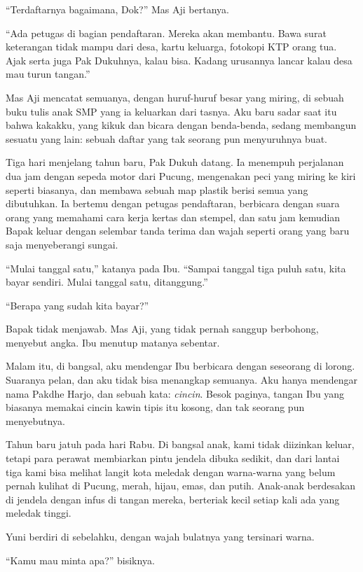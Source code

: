 \documentclass[11pt,twoside,openany]{book}
\makeatletter
\newcommand{\scenebreak}{\par\vspace{0.9em}{\centering\textsc{*\hspace{0.7em}*\hspace{0.7em}*}\par}\vspace{0.9em}\@afterindentfalse\@afterheading}
\makeatother
\begin{document}
``Terdaftarnya bagaimana, Dok?'' Mas Aji bertanya.

``Ada petugas di bagian pendaftaran. Mereka akan membantu. Bawa surat keterangan tidak mampu dari desa, kartu keluarga, fotokopi KTP orang tua. Ajak serta juga Pak Dukuhnya, kalau bisa. Kadang urusannya lancar kalau desa mau turun tangan.''

Mas Aji mencatat semuanya, dengan huruf-huruf besar yang miring, di sebuah buku tulis anak SMP yang ia keluarkan dari tasnya. Aku baru sadar saat itu bahwa kakakku, yang kikuk dan bicara dengan benda-benda, sedang membangun sesuatu yang lain: sebuah daftar yang tak seorang pun menyuruhnya buat.

\scenebreak
Tiga hari menjelang tahun baru, Pak Dukuh datang. Ia menempuh perjalanan dua jam dengan sepeda motor dari Pucung, mengenakan peci yang miring ke kiri seperti biasanya, dan membawa sebuah map plastik berisi semua yang dibutuhkan. Ia bertemu dengan petugas pendaftaran, berbicara dengan suara orang yang memahami cara kerja kertas dan stempel, dan satu jam kemudian Bapak keluar dengan selembar tanda terima dan wajah seperti orang yang baru saja menyeberangi sungai.

``Mulai tanggal satu,'' katanya pada Ibu. ``Sampai tanggal tiga puluh satu, kita bayar sendiri. Mulai tanggal satu, ditanggung.''

``Berapa yang sudah kita bayar?''

Bapak tidak menjawab. Mas Aji, yang tidak pernah sanggup berbohong, menyebut angka. Ibu menutup matanya sebentar.

Malam itu, di bangsal, aku mendengar Ibu berbicara dengan seseorang di lorong. Suaranya pelan, dan aku tidak bisa menangkap semuanya. Aku hanya mendengar nama Pakdhe Harjo, dan sebuah kata: \emph{cincin}. Besok paginya, tangan Ibu yang biasanya memakai cincin kawin tipis itu kosong, dan tak seorang pun menyebutnya.

\scenebreak
Tahun baru jatuh pada hari Rabu. Di bangsal anak, kami tidak diizinkan keluar, tetapi para perawat membiarkan pintu jendela dibuka sedikit, dan dari lantai tiga kami bisa melihat langit kota meledak dengan warna-warna yang belum pernah kulihat di Pucung, merah, hijau, emas, dan putih. Anak-anak berdesakan di jendela dengan infus di tangan mereka, berteriak kecil setiap kali ada yang meledak tinggi.

Yuni berdiri di sebelahku, dengan wajah bulatnya yang tersinari warna.

``Kamu mau minta apa?'' bisiknya.
\end{document}
